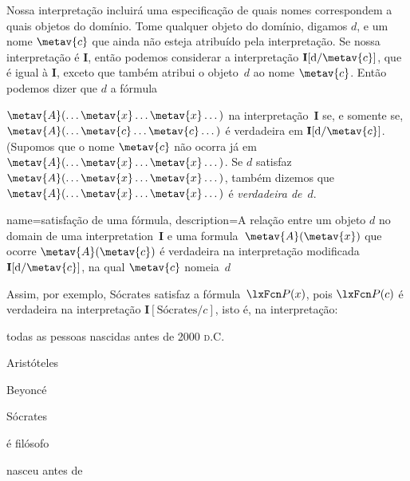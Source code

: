 Nossa interpretação incluirá uma especificação de quais nomes correspondem a quais objetos do domínio. Tome qualquer objeto do domínio, digamos $d$, e um nome $\metav{c}$ que ainda não esteja atribuído pela interpretação. Se nossa interpretação é $\mathbf{I}$, então podemos considerar a interpretação $\mathbf{I}[\text{d}/\metav{c}]$, que é igual à $\mathbf{I}$, exceto que também atribui o objeto~$d$ ao nome $\metav{c}$. Então podemos dizer que $d$  a fórmula







$\metav{A}(\dots\metav{x}\dots\metav{x}\dots)$ na
interpretação~$\mathbf{I}$ se, e somente se,
$\metav{A}(\dots\metav{c}\dots\metav{c}\dots)$ é verdadeira em
$\mathbf{I}[\text{d}/\metav{c}]$. (Supomos que o nome $\metav{c}$ não
ocorra já em
$\metav{A}(\dots\metav{x}\dots\metav{x}\dots)$. Se $d$ satisfaz
$\metav{A}(\dots\metav{x}\dots\metav{x}\dots)$, também dizemos que
$\metav{A}(\dots\metav{x}\dots\metav{x}\dots)$ é \emph{verdadeira de}~$d$.


{
  name=satisfação de uma fórmula,
  description={A relação entre um objeto $d$ no \gls{domain} de uma
    \gls{interpretation}~$\mathbf{I}$ e uma
    \gls{formula}~$\metav{A}(\metav{x})$ que ocorre \ifeff{}
    $\metav{A}(\metav{c})$ é verdadeira na interpretação modificada
    $\mathbf{I}[\text{d}/\metav{c}]$, na qual $\metav{c}$ nomeia~$d$}
}

Assim, por exemplo, Sócrates satisfaz a fórmula~$\atom{P}{x}$, pois $\atom{P}{c}$ é verdadeira na interpretação $\mathbf{I}[\text{Sócrates}/c]$, isto é, na interpretação:
\begin{ekey}
\item[\text{domínio}] todas as pessoas nascidas antes de 2000 \textsc{d.C.}
	\item[a] Aristóteles
	\item[b] Beyonc\'e
	\item[c] Sócrates
\item[\atom{P}{x}]  é filósofo
\item[\atom{R}{x,y}]  nasceu antes de 
\end{ekey}

